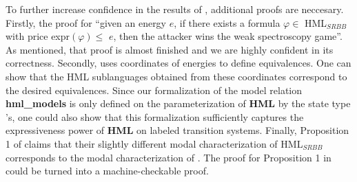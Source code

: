 To further increase confidence in the results of \cite{bisping2023lineartimebranchingtime}, additional proofs are neccesary. Firstly, the proof for ``given an energy $e$, if there exists a formula $\varphi \in$ HML$_{SRBB}$ with price expr$(\varphi) \leq$ $e$, then the attacker wins the weak spectroscopy game''.
As mentioned, that proof is almost finished and we are highly confident in its correctness. 
Secondly, \cite{bisping2023lineartimebranchingtime} uses coordinates of energies to define equivalences. One can show that the HML sublanguages obtained from these coordinates correspond to the desired equivalences.
Since our formalization of the model relation \textbf{hml\_models} is only defined on the parameterization of \textbf{HML} by the state type 's, one could also show that this formalization sufficiently captures the expressiveness power of \textbf{HML} on labeled transition systems.
Finally, Proposition 1 of \cite{bisping2023lineartimebranchingtime} claims that their slightly different modal characterization of HML$_{SRBB}$ corresponds to the modal characterization of \cite{FOKKINK2019104435}. 
The proof for Proposition 1 in \cite{bisping2023lineartimebranchingtime} could be turned into a machine-checkable proof. 